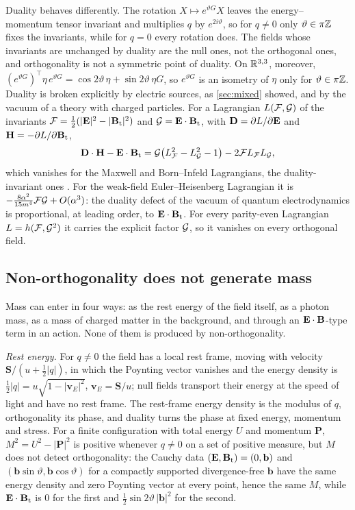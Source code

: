 Duality behaves differently. The rotation $X\mapsto e^{\vartheta G}X$ leaves the energy--momentum tensor invariant and multiplies $q$ by
$e^{2i\vartheta}$, so for $q\neq0$ only $\vartheta\in\pi\mathbb{Z}$ fixes the invariants, while for $q=0$ every rotation does. The fields whose
invariants are unchanged by duality are the null ones, not the orthogonal ones, and orthogonality is not a symmetric point of duality.
On $\mathbb{R}^{3,3}$, moreover, $(e^{\vartheta G})^{\!\top}\eta\,e^{\vartheta G}=\cos2\vartheta\,\eta+\sin2\vartheta\,\eta G$, so $e^{\vartheta G}$ is an
isometry of $\eta$ only for $\vartheta\in\pi\mathbb{Z}$. Duality is broken explicitly by electric sources, as \cref{sec:mixed} showed, and by the
vacuum of a theory with charged particles. For a Lagrangian $L(\mathcal F,\mathcal G)$ of the invariants $\mathcal F=\tfrac12(|\mathbf E|^2-|\mathbf B_{\rm t}|^2)$ and
$\mathcal G=\mathbf E\cdot\mathbf B_{\rm t}$, with $\mathbf D=\partial L/\partial\mathbf E$ and $\mathbf H=-\partial L/\partial\mathbf B_{\rm t}$,
\[
\mathbf D\cdot\mathbf H-\mathbf E\cdot\mathbf B_{\rm t}=\mathcal G\bigl(L_\mathcal F^2-L_\mathcal G^2-1\bigr)-2\mathcal F L_\mathcal F L_\mathcal G ,
\]
which vanishes for the Maxwell and Born--Infeld Lagrangians, the duality-invariant ones \cite{GaillardZumino81,GibbonsRasheed95}. For the
weak-field Euler--Heisenberg Lagrangian \cite{HeisenbergEuler36,Dunne04} it is $-\tfrac{8\alpha^2}{15m^4}\mathcal F\mathcal G+O(\alpha^3)$: the duality
defect of the vacuum of quantum electrodynamics is proportional, at leading order, to $\mathbf E\cdot\mathbf B_{\rm t}$. For every parity-even Lagrangian
$L=h(\mathcal F,\mathcal G^2)$ it carries the explicit factor $\mathcal G$, so it vanishes on every orthogonal field.

\subsection{Non-orthogonality does not generate mass}

Mass can enter in four ways: as the rest energy of the field itself, as a photon mass, as a mass of charged matter in the background, and
through an $\mathbf E\cdot\mathbf B$-type term in an action. None of them is produced by non-orthogonality.

\emph{Rest energy.} For $q\neq0$ the field has a local rest frame, moving with velocity $\mathbf S/(u+\tfrac12|q|)$, in which the Poynting
vector vanishes and the energy density is $\tfrac12|q|=u\sqrt{1-|\mathbf v_E|^2}$, $\mathbf v_E=\mathbf S/u$; null fields transport their
energy at the speed of light and have no rest frame. The rest-frame energy density is the modulus of $q$, orthogonality its phase, and
duality turns the phase at fixed energy, momentum and stress. For a finite configuration with total energy $U$ and momentum $\mathbf P$,
$M^2=U^2-|\mathbf P|^2$ is positive whenever $q\neq0$ on a set of positive measure, but $M$ does not detect orthogonality: the Cauchy data
$(\mathbf E,\mathbf B_{\rm t})=(0,\mathbf b)$ and $(\mathbf b\sin\vartheta,\mathbf b\cos\vartheta)$ for a compactly supported divergence-free $\mathbf b$ have the same
energy density and zero Poynting vector at every point, hence the same $M$, while $\mathbf E\cdot\mathbf B_{\rm t}$ is $0$ for the first and
$\tfrac12\sin2\vartheta\,|\mathbf b|^2$ for the second.

